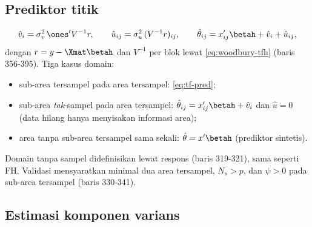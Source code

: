 \subsection{Prediktor titik}\label{sec:twofold-prediktor}

\begin{equation}
  \hat v_i=\sigma_v^2\,\ones'V^{-1}r,\qquad
  \hat u_{ij}=\sigma_u^2\,(V^{-1}r)_{ij},\qquad
  \hat\theta_{ij}=x_{ij}'\betah+\hat v_i+\hat u_{ij},
  \label{eq:tf-pred}
\end{equation}
dengan $r=y-\Xmat\betah$ dan $V^{-1}$ per blok lewat \eqref{eq:woodbury-tfh}
(baris 356-395). Tiga kasus domain:
\begin{itemize}
  \item sub-area tersampel pada area tersampel: \eqref{eq:tf-pred};
  \item sub-area \emph{tak}-sampel pada area tersampel:
        $\hat\theta_{ij}=x_{ij}'\betah+\hat v_i$ dan $\hat u=0$ (data hilang
        hanya menyisakan informasi area);
  \item area tanpa sub-area tersampel sama sekali: $\hat\theta=x'\betah$
        (prediktor sintetis).
\end{itemize}
Domain tanpa sampel didefinisikan lewat respons 
(baris 319-321), sama seperti FH. Validasi mensyaratkan minimal dua area
tersampel, $N_s>p$, dan $\psi>0$ pada sub-area tersampel (baris 330-341).

\subsection{Estimasi komponen varians}\label{sec:twofold-varians}

